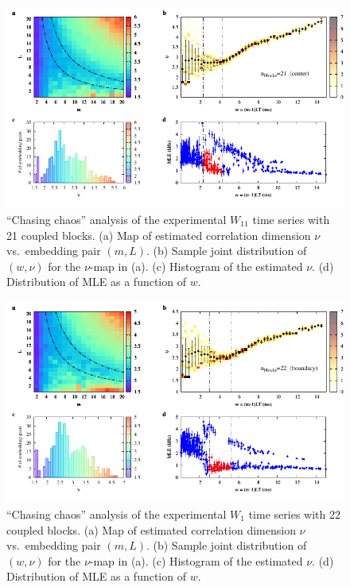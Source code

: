 \begin{appendices}
\begin{figure}[!htbp]
    \centering
    \includegraphics[width=\linewidth]{../blocks/21_blocks/middle/2e5_points/plots/chaos_low.pdf}
    \caption{``Chasing chaos'' analysis of the experimental $W_{11}$ time series with 21 coupled blocks.
    (a) Map of estimated correlation dimension $\nu$ vs.\ embedding pair $(m, L)$.
    (b) Sample joint distribution of $(w,\nu)$ for the $\nu$-map in (a).
    (c) Histogram of the estimated $\nu$. (d) Distribution of MLE as a function of $w$.
    } 
\end{figure}

\begin{figure}[!htbp]
    \centering
    \includegraphics[width=\linewidth]{../blocks/22_blocks/2e5_points/plots/chaos_low.pdf}
    \caption{``Chasing chaos'' analysis of the experimental $W_1$ time series with 22 coupled blocks.
    (a) Map of estimated correlation dimension $\nu$ vs.\ embedding pair $(m, L)$.
    (b) Sample joint distribution of $(w,\nu)$ for the $\nu$-map in (a).
    (c) Histogram of the estimated $\nu$. (d) Distribution of MLE as a function of $w$.
    } 
\end{figure}


\end{appendices}
